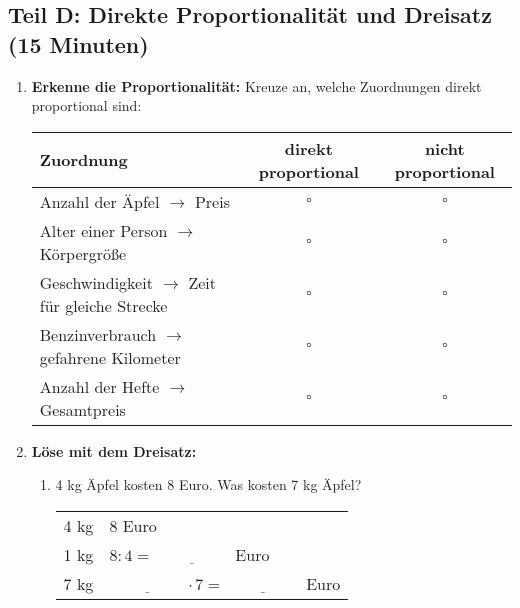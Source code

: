 \subsection*{Teil D: Direkte Proportionalität und Dreisatz (15 Minuten)}

\begin{enumerate}[label=\arabic*.]
    \item \textbf{Erkenne die Proportionalität:}
    Kreuze an, welche Zuordnungen direkt proportional sind:
    \vspace{0.5cm}

    \begin{tabular}{|l|c|c|}
        \hline
        \textbf{Zuordnung} & \textbf{direkt proportional} & \textbf{nicht proportional} \\
        \hline
        Anzahl der Äpfel $\rightarrow$ Preis & $\square$ & $\square$ \\
        \hline
        Alter einer Person $\rightarrow$ Körpergröße & $\square$ & $\square$ \\
        \hline
        Geschwindigkeit $\rightarrow$ Zeit für gleiche Strecke & $\square$ & $\square$ \\
        \hline
        Benzinverbrauch $\rightarrow$ gefahrene Kilometer & $\square$ & $\square$ \\
        \hline
        Anzahl der Hefte $\rightarrow$ Gesamtpreis & $\square$ & $\square$ \\
        \hline
    \end{tabular}

    \vspace{1cm}

    \item \textbf{Löse mit dem Dreisatz:}
    \vspace{0.5cm}

    \begin{enumerate}[label=\alph*)]
        \item 4 kg Äpfel kosten 8 Euro. Was kosten 7 kg Äpfel?

        \begin{tabular}{l|l}
            4 kg & 8 Euro \\
            1 kg & $8 : 4 = \underline{\hspace{2cm}}$ Euro \\
            7 kg & $\underline{\hspace{2cm}} \cdot 7 = \underline{\hspace{2cm}}$ Euro \\
        \end{tabular}


\end{enumerate}
\end{enumerate}
